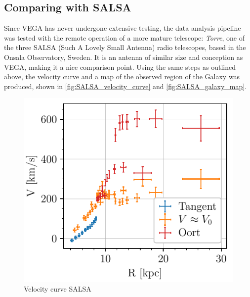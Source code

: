 \subsection{Comparing with SALSA}
Since VEGA  has never undergone extensive testing, the data analysis pipeline was tested with the remote operation of a more mature telescope: \emph{Torre}, one of the three SALSA (Such A Lovely Small Antenna) radio telescopes, based in the Onsala Observatory, Sweden.
It is an antenna of similar size and conception as VEGA, making it a nice comparison point. Using the same steps as outlined above, the velocity curve and a map of the observed region of the Galaxy was produced, shown in \autoref{fig:SALSA_velocity_curve} and \autoref{fig:SALSA_galaxy_map}.

\begin{figure}[htbp]
    \begin{minipage}[t]{0.5\textwidth}
        \centering
        \captionsetup{width=.95\textwidth}
        \includegraphics[scale=1]{figures/SALSA_velocity_curve.pdf}
        \caption{Velocity curve SALSA}
        \label{fig:SALSA_velocity_curve}
    \end{minipage}
    \begin{minipage}[t]{0.5\textwidth}
        \centering
        \captionsetup{width=.95\textwidth}

\end{minipage}
\end{figure}
